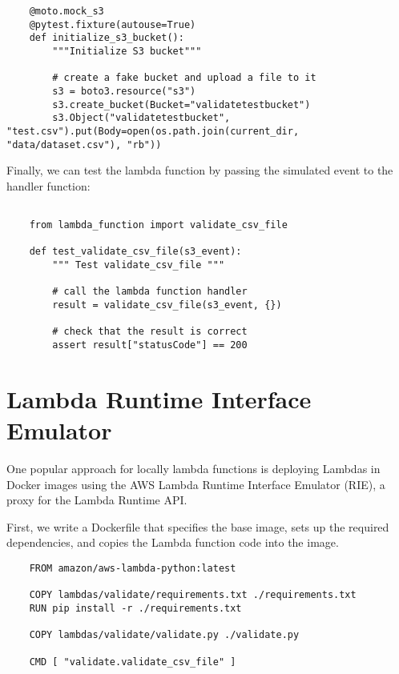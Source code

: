 \documentclass{article}
\begin{document}
\begin{verbatim}
    @moto.mock_s3
    @pytest.fixture(autouse=True)
    def initialize_s3_bucket():
        """Initialize S3 bucket"""

        # create a fake bucket and upload a file to it
        s3 = boto3.resource("s3")
        s3.create_bucket(Bucket="validatetestbucket")
        s3.Object("validatetestbucket", "test.csv").put(Body=open(os.path.join(current_dir, "data/dataset.csv"), "rb"))
\end{verbatim}

Finally, we can test the lambda function by passing the simulated event to the handler function:

\begin{verbatim}

    from lambda_function import validate_csv_file

    def test_validate_csv_file(s3_event):
        """ Test validate_csv_file """

        # call the lambda function handler
        result = validate_csv_file(s3_event, {})

        # check that the result is correct
        assert result["statusCode"] == 200

\end{verbatim}

\section{Lambda Runtime Interface Emulator}

One popular approach for locally lambda functions is deploying Lambdas in Docker images using
the AWS Lambda Runtime Interface Emulator (RIE), a proxy for the Lambda Runtime API.

First, we write a Dockerfile that specifies the base image, sets up the required dependencies, and copies the Lambda function code into the image.

\begin{verbatim}
    FROM amazon/aws-lambda-python:latest

    COPY lambdas/validate/requirements.txt ./requirements.txt
    RUN pip install -r ./requirements.txt

    COPY lambdas/validate/validate.py ./validate.py

    CMD [ "validate.validate_csv_file" ]

\end{verbatim}
\end{document}
